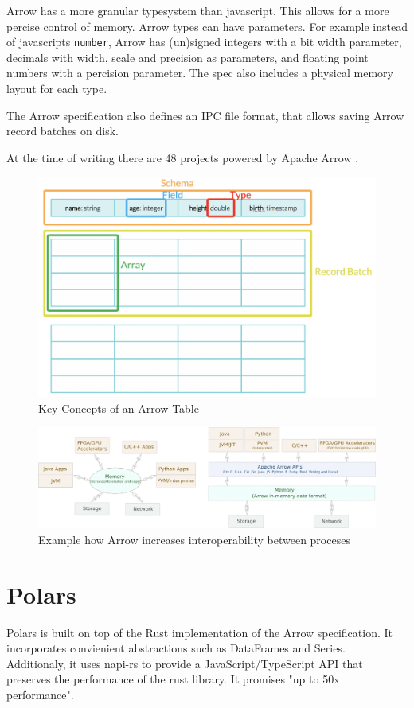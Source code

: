 Arrow has a more granular typesystem than javascript. This allows for a more percise control of memory.
Arrow types can have parameters.
For example instead of javascripts \Verb|number|, Arrow has (un)signed integers with a bit width parameter,
decimals with width, scale and precision as parameters, and floating point numbers with a percision parameter.
The spec also includes a physical memory layout for each type.

The Arrow specification also defines an \ac{IPC} file format, that allows saving Arrow record batches on disk.

At the time of writing there are 48 projects powered by Apache Arrow \autocite{arrow:projects}.

\begin{figure}
	\includegraphics[width=\textwidth]{resources/arrow_tab}
	\caption{Key Concepts of an Arrow Table \autocite{Dremio}}
	\label{fig:arrow_tab}
\end{figure}
\begin{figure}
	\includegraphics[width=\textwidth]{resources/arrow_interop}
	\caption{Example how Arrow increases interoperability between proceses \autocite{Ahmad2020}}
	\label{fig:arrow_com}
\end{figure}


\section{Polars}
\label{section:polars}
Polars is built on top of the Rust implementation of the Arrow specification.
It incorporates convienient abstractions such as DataFrames and Series.
Additionaly, it uses napi-rs to provide a JavaScript/TypeScript \ac{API} that preserves the performance of the rust library.
It promises "up to 50x performance".
\autocite{polars}

